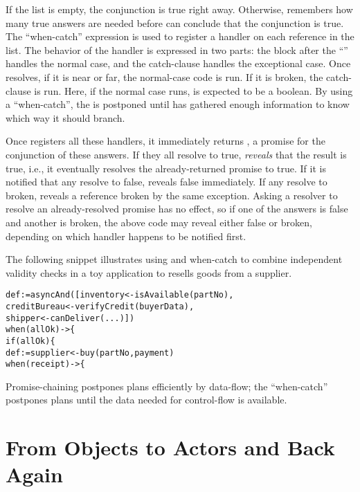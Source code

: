 \documentclass{llncs}
\begin{document}
If the list is empty, the conjunction is true right away. Otherwise,
 remembers how many true answers are needed before
 can conclude that the conjunction is true. The
``when-catch'' expression is used to register a handler on each
reference in the list. The behavior of the handler is expressed in two
parts: the block after the ``\code{->}'' handles the normal case,
and the catch-clause handles the exceptional case. Once 
resolves, if it is near or far, the normal-case code is run. If it is
broken, the catch-clause is run.  Here, if the normal case runs,
 is expected to be a boolean. By using a ``when-catch'',
the  is postponed until  has gathered enough information to
know which way it should branch.

Once  registers all these handlers, it immediately
returns , a promise for the conjunction of these
answers. If they all resolve to true,  \emph{reveals}
that the result is true, i.e., it eventually resolves the
already-returned promise to true. If it is notified that any resolve to
false,  reveals false immediately. If any resolve to
broken,  reveals a reference broken by the same
exception. Asking a resolver to resolve an already-resolved promise
has no effect, so if one of the answers is false and another is broken,
the above  code may reveal either false or broken,
depending on which handler happens to be notified first.

The following snippet illustrates using  and when-catch
to combine independent validity checks in a toy application to resells
goods from a supplier.
%
\begin{alltt}
   def  := asyncAnd([inventory <- isAvailable(partNo),
                          creditBureau <- verifyCredit(buyerData),
                          shipper <- canDeliver(...)])
   when (allOk) -> \{
       if (allOk) \{
           def  := supplier <- buy(partNo, payment)
           when (receipt) -> \{
\end{alltt}
%
Promise-chaining postpones plans efficiently by data-flow; the
``when-catch'' postpones plans until the data needed for control-flow
is available.

\section{From Objects to Actors and Back Again}
\end{document}
